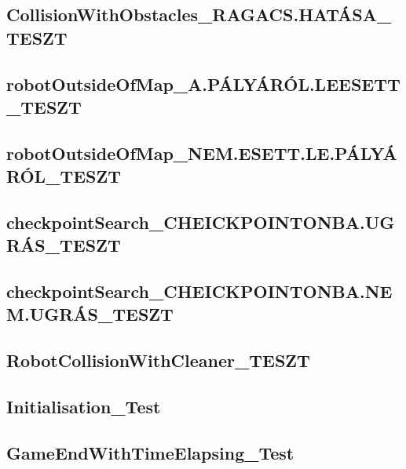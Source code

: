 
\subsection{CollisionWithObstacles\_RAGACS.HATÁSA\_TESZT }


\subsection{robotOutsideOfMap\_A.PÁLYÁRÓL.LEESETT\_TESZT}


\subsection{robotOutsideOfMap\_NEM.ESETT.LE.PÁLYÁRÓL\_TESZT}


\subsection{checkpointSearch\_CHEICKPOINTONBA.UGRÁS\_TESZT}


\subsection{checkpointSearch\_CHEICKPOINTONBA.NEM.UGRÁS\_TESZT}


\subsection{RobotCollisionWithCleaner\_TESZT}


\subsection{Initialisation\_Test}


\subsection{GameEndWithTimeElapsing\_Test}

